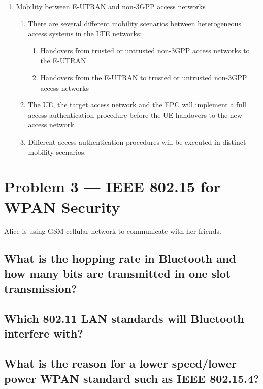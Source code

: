 \documentclass[a4paper]{report}
\begin{document}
\begin{enumerate}
\begin{enumerate}
\begin{enumerate}
\begin{enumerate}
            \end{enumerate}
        \end{enumerate}
    \item Mobility between E-UTRAN and non-3GPP access networks
        \begin{enumerate}
        \item There are several different mobility scenarios between heterogeneous access systems in the LTE networks:
            \begin{enumerate}
            \item Handovers from trusted or untrusted non-3GPP access networks to the E-UTRAN
            \item Handovers from the E-UTRAN to trusted or untrusted non-3GPP access networks
            \end{enumerate}
        \item The UE, the target access network and the EPC will implement a full access authentication procedure before
                 the UE handovers to the new access network.
        \item Different access authentication procedures will be executed in distinct mobility scenarios.
        \end{enumerate}
    \end{enumerate}
\end{enumerate}

\section{Problem 3 --- IEEE 802.15 for WPAN Security}

Alice is using GSM cellular network to communicate with her friends.

\subsection{What is the hopping rate in Bluetooth and how many bits are
            transmitted in one slot transmission?}


\subsection{Which 802.11 LAN standards will Bluetooth interfere with?}


\subsection{What is the reason for a lower speed/lower power WPAN standard
            such as IEEE 802.15.4?}
\end{document}

